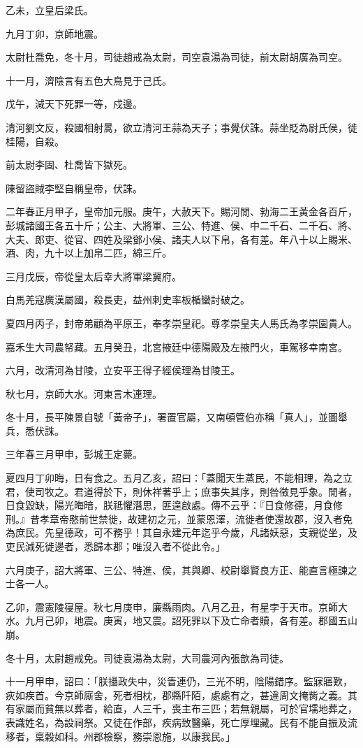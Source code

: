 \begin{pinyinscope}
乙未，立皇后梁氏。

九月丁卯，京師地震。

太尉杜喬免，冬十月，司徒趙戒為太尉，司空袁湯為司徒，前太尉胡廣為司空。

十一月，濟陰言有五色大鳥見于己氏。

戊午，減天下死罪一等，戍邊。

清河劉文反，殺國相射暠，欲立清河王蒜為天子；事覺伏誅。蒜坐貶為尉氏侯，徙桂陽，自殺。

前太尉李固、杜喬皆下獄死。

陳留盜賊李堅自稱皇帝，伏誅。

二年春正月甲子，皇帝加元服。庚午，大赦天下。賜河閒、勃海二王黃金各百斤，彭城諸國王各五十斤；公主、大將軍、三公、特進、侯、中二千石、二千石、將、大夫、郎吏、從官、四姓及梁鄧小侯、諸夫人以下帛，各有差。年八十以上賜米、酒、肉，九十以上加帛二匹，綿三斤。

三月戊辰，帝從皇太后幸大將軍梁冀府。

白馬羌寇廣漢屬國，殺長吏，益州刺史率板楯蠻討破之。

夏四月丙子，封帝弟顧為平原王，奉孝崇皇祀。尊孝崇皇夫人馬氏為孝崇園貴人。

嘉禾生大司農帑藏。五月癸丑，北宮掖廷中德陽殿及左掖門火，車駕移幸南宮。

六月，改清河為甘陵，立安平王得子經侯理為甘陵王。

秋七月，京師大水。河東言木連理。

冬十月，長平陳景自號「黃帝子」，署置官屬，又南頓管伯亦稱「真人」，並圖舉兵，悉伏誅。

三年春三月甲申，彭城王定薨。

夏四月丁卯晦，日有食之。五月乙亥，詔曰：「蓋聞天生蒸民，不能相理，為之立君，使司牧之。君道得於下，則休祥著乎上；庶事失其序，則咎徵見乎象。閒者，日食毀缺，陽光晦暗，朕祗懼潛思，匪遑啟處。傳不云乎：『日食修德，月食修刑。』昔孝章帝愍前世禁徙，故建初之元，並蒙恩澤，流徙者使還故郡，沒入者免為庶民。先皇德政，可不務乎！其自永建元年迄乎今歲，凡諸妖惡，支親從坐，及吏民減死徙邊者，悉歸本郡；唯沒入者不從此令。」

六月庚子，詔大將軍、三公、特進、侯，其與卿、校尉舉賢良方正、能直言極諫之士各一人。

乙卯，震憲陵寑屋。秋七月庚申，廉縣雨肉。八月乙丑，有星孛于天巿。京師大水。九月己卯，地震。庚寅，地又震。詔死罪以下及亡命者贖，各有差。郡國五山崩。

冬十月，太尉趙戒免。司徒袁湯為太尉，大司農河內張歆為司徒。

十一月甲申，詔曰：「朕攝政失中，災眚連仍，三光不明，陰陽錯序。監寐寤歎，疢如疾首。今京師廝舍，死者相枕，郡縣阡陌，處處有之，甚違周文掩胔之義。其有家屬而貧無以葬者，給直，人三千，喪主布三匹；若無親屬，可於官壖地葬之，表識姓名，為設祠祭。又徒在作部，疾病致醫藥，死亡厚埋藏。民有不能自振及流移者，稟穀如科。州郡檢察，務崇恩施，以康我民。」


\end{pinyinscope}
